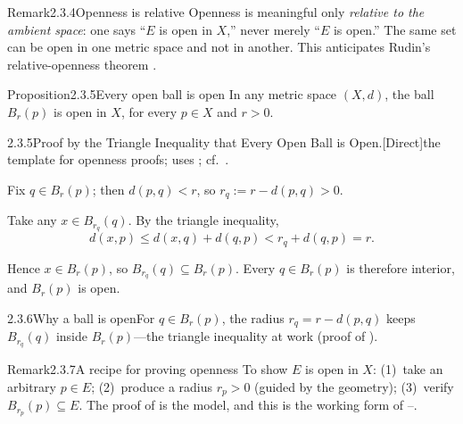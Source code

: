 \documentclass[main.tex]{subfiles}
\begin{document}
\begin{ObjL}{Remark}{2.3.4}{Openness is relative}
Openness is meaningful only \emph{relative to the ambient space}: one says ``$E$ is open in $X$,''
never merely ``$E$ is open.'' The same set can be open in one metric space and not in another.
This anticipates Rudin's relative-openness theorem .
\end{ObjL}

\begin{Obj}{Proposition}{2.3.5}{Every open ball is open}
In any metric space $(X,d)$, the ball $B_r(p)$ is open in $X$, for every $p\in X$ and $r>0$.
\end{Obj}
\begin{Prf}{2.3.5}{Proof by the Triangle Inequality that Every Open Ball is Open.}{[Direct]\quad the template for openness proofs; uses ; cf.\ .}
\item Fix $q\in B_r(p)$; then $d(p,q)<r$, so $r_q:=r-d(p,q)>0$.
\item Take any $x\in B_{r_q}(q)$. By the triangle inequality,
  \[ d(x,p)\le d(x,q)+d(q,p)<r_q+d(q,p)=r. \]
\item Hence $x\in B_r(p)$, so $B_{r_q}(q)\subseteq B_r(p)$. Every $q\in B_r(p)$ is therefore interior,
  and $B_r(p)$ is open.
\end{Prf}

\begin{Fig}{2.3.6}{Why a ball is open}{For $q\in B_r(p)$, the radius $r_q=r-d(p,q)$ keeps $B_{r_q}(q)$ inside $B_r(p)$---the triangle inequality at work (proof of ).}
\end{Fig}

\begin{ObjL}{Remark}{2.3.7}{A recipe for proving openness}
To show $E$ is open in $X$: (1)~take an arbitrary $p\in E$; (2)~produce a radius $r_p>0$ (guided by
the geometry); (3)~verify $B_{r_p}(p)\subseteq E$. The proof of  is the model, and
this is the working form of --.
\end{ObjL}

\ifSubfilesClassLoaded{\clearpage\objindex}{}
\end{document}
